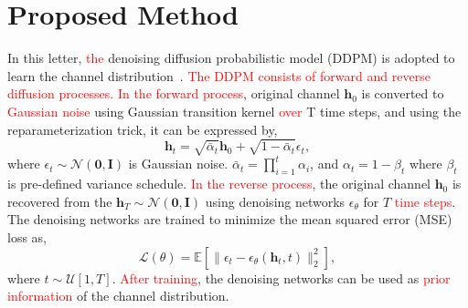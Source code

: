 \documentclass[lettersize,journal]{IEEEtran}
\newcommand{\tred}{\textcolor{red}}
\begin{document}
\section{Proposed Method}

In this letter, \tred{the} denoising diffusion probabilistic model (DDPM) is adopted to learn the channel distribution~\cite{hoDenoisingDiffusionProbabilistic2020}. \tred{The DDPM consists of forward and reverse diffusion processes.} \tred{In the forward process}, original channel $\mathbf{h}_{0}$ is converted to \tred{Gaussian noise} using Gaussian transition kernel \tred{over} T time steps, and using the reparameterization trick, it can be expressed by,
\begin{equation}
\mathbf{h}_{t} = \sqrt{ \bar{\alpha}_{t} }\mathbf{h}_{0} + \sqrt{ 1-\bar{\alpha}_{t} }\epsilon_{t},
\end{equation}
where $\epsilon_{t}\sim\mathcal{N}(\mathbf{0},\mathbf{I})$ is Gaussian noise. $\bar{\alpha}_{t}=\prod_{i=1}^{t}\alpha_{i}$, and $\alpha_{t}=1-\beta_{t}$ where $\beta_{t}$ is pre-defined variance schedule. \tred{In the reverse process}, the original channel $\mathbf{h}_{0}$ is recovered from the $\mathbf{h}_{T}\sim\mathcal{N}(\mathbf{0},\mathbf{I})$ using denoising networks $\epsilon_{\theta}$ for $T$ \tred{time steps}. The denoising networks are trained to minimize the mean squared error (MSE) loss as,
\begin{equation}
\mathcal{L}(\theta) = \mathbb{E}[\|\epsilon_{t} - \epsilon_{\theta}(\mathbf{h}_{t},t)\|_{2}^{2}],
\end{equation}
where $t\sim\mathcal{U}[1,T]$. \tred{After training}, the denoising networks can be used as \tred{prior information} of the channel distribution.
\end{document}
